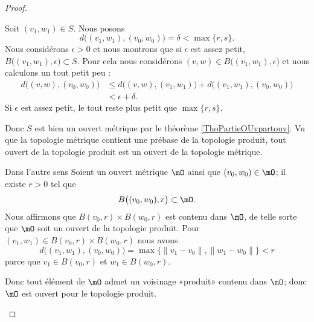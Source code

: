 \begin{proof}
\begin{subproof}
\begin{subproof}
            Soit \( (v_1,w_1)\in S\). Nous posons
            \begin{equation}
                d\big( (v_1,w_1), (v_0,w_0) \big)=\delta<\max\{ r,s \}.
            \end{equation}
            Nous considérons \( \epsilon>0\) et nous montrons que si \( \epsilon\) est assez petit, \( B\big( (v_1,w_1),\epsilon \big)\subset S\). Pour cela nous considérons \( (v,w)\in B\big( (v_1,w_1),\epsilon \big)\) et nous calculons un tout petit peu :
            \begin{subequations}
                \begin{align}
                    d\big( (v,w),(v_0,w_0) \big)&\leq d\big( (v,w),(v_1,w_1) \big)+d\big( (v_1,w_1),(v_0,w_0) \big)\\
                    &<\epsilon+\delta.
                \end{align}
            \end{subequations}
            Si \( \epsilon\) est assez petit, le tout reste plus petit que \( \max\{ r,s \}\).

            Donc \( S\) est bien un ouvert métrique par le théorème \ref{ThoPartieOUvpartouv}. Vu que la topologie métrique contient une prébase de la topologie produit, tout ouvert de la topologie produit est un ouvert de la topologie métrique.
        \item[Dans l'autre sens]
            Soient un ouvert métrique \( \mO\) ainsi que \( (v_0,w_0)\in \mO\); il existe \( r>0\) tel que
            \begin{equation}
                B\big( (v_0,w_0),r \big)\subset \mO.
            \end{equation}
            Nous affirmons que \( B(v_0,r)\times B(w_0,r)\) est contenu dans \( \mO\), de telle sorte que \( \mO\) soit un ouvert de la topologie produit. Pour \( (v_1,w_1)\in B(v_0,r)\times B(w_0,r)\) nous avons
            \begin{equation}
                    d\big( (v_1,w_1),(v_0,w_0) \big)=\max\{ \| v_1-v_0 \|,\| w_1-w_0 \| \}<r
            \end{equation}
            parce que \( v_1\in B(v_0,r)\) et \( w_1\in B(w_0,r)\).

            Donc tout élément de \( \mO\) admet un voisinage «produit» contenu dans \( \mO\); donc \( \mO\) est ouvert pour le topologie produit.
    \end{subproof}
    \end{subproof}
\end{proof}

